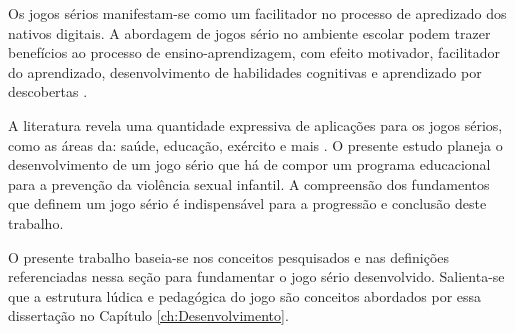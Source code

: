 

Os jogos sérios manifestam-se como um facilitador no processo de apredizado dos nativos digitais. A abordagem de jogos sério no ambiente escolar podem trazer benefícios ao processo de ensino-aprendizagem, com efeito motivador, facilitador do aprendizado, desenvolvimento de habilidades cognitivas e aprendizado por descobertas \cite{de2017move4math}.

A literatura revela uma quantidade expressiva de aplicações para os jogos sérios, como as áreas da: saúde, educação, exército e mais \cite{zyda2005visual}. O presente estudo planeja o desenvolvimento de um jogo sério que há de compor um programa educacional para a prevenção da violência sexual infantil. A compreensão dos fundamentos que definem um jogo sério é indispensável para a progressão e conclusão deste trabalho. 

O presente trabalho baseia-se nos conceitos pesquisados e nas definições referenciadas nessa seção para fundamentar o jogo sério desenvolvido. Salienta-se que a estrutura lúdica e pedagógica do jogo são conceitos abordados por essa dissertação no Capítulo \ref{ch:Desenvolvimento}.




\newpage


























